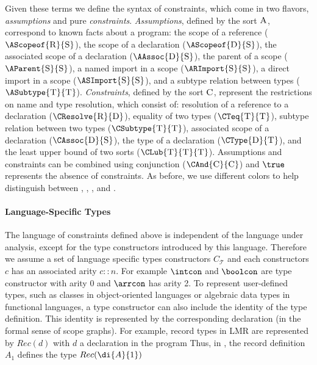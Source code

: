\noindent Given these terms we define the syntax of constraints, which come in
two flavors, \emph{assumptions} and pure \emph{constraints}.
\emph{Assumptions}, defined by the sort $\text{\sc A}$, correspond to known facts
about a program: 
the scope of a reference ($\AScopeof{\sort{R}}{\sort{S}}$),
the scope of a declaration ($\AScopeof{\sort{D}}{\sort{S}}$),
the associated scope of a declaration ($\AAssoc{\sort{D}}{\sort{S}}$),
the parent of a scope ($\AParent{\sort{S}}{\sort{S}}$),
a named import in a scope ($\ARImport{\sort{S}}{\sort{S}}$),
a direct import in a scope ($\ASImport{\sort{S}}{\sort{S}}$),
and a subtype relation between types ($\ASubtype{\sort{T}}{\sort{T}}$).
\emph{Constraints}, defined by the sort $\text{\sc C}$, represent the restrictions
on name and type resolution, which consist of:
resolution of a reference to a declaration ($\CResolve{\sort{R}}{\sort{D}}$),
equality of two types ($\CTeq{\sort{T}}{\sort{T}}$),
subtype relation between two types ($\CSubtype{\sort{T}}{\sort{T}}$),
associated scope of a declaration ($\CAssoc{\sort{D}}{\sort{S}}$),
the type of a declaration ($\CType{\sort{D}}{\sort{T}}$),
and the least upper bound of two sorts ($\CLub{\sort{T}}{\sort{T}}{\sort{T}}$).
Assumptions and constraints can be combined using conjunction 
($\CAnd{\sort{C}}{\sort{C}}$) and $\true$ represents
the absence of constraints.  As before, we use different colors to help
distinguish between , 
, 
, and 
.

\paragraph{Language-Specific Types}

The language of constraints defined above is independent of the language under
analysis, except for the type constructors introduced by this language. 
Therefore we assume a set of language specific types constructors $C_{\mathcal{T}}$
and each constructors $c$ has an associated arity $c :: n$. 
For example $\intcon$ and $\boolcon$ are type constructor with arity $0$ and
$\arrcon$ has arity 2. 
To represent user-defined types, such as classes in object-oriented languages or algebraic
data types in functional languages, a type constructor can also include the identity 
of the type definition. This identity is represented by the corresponding 
declaration (in the formal sense of scope graphs).
For example, record types in LMR are represented by $Rec(d)$ with $d$ a
declaration in the program
Thus, in , the record definition $A_1$ defines the type
$Rec(\di{A}{1})$



